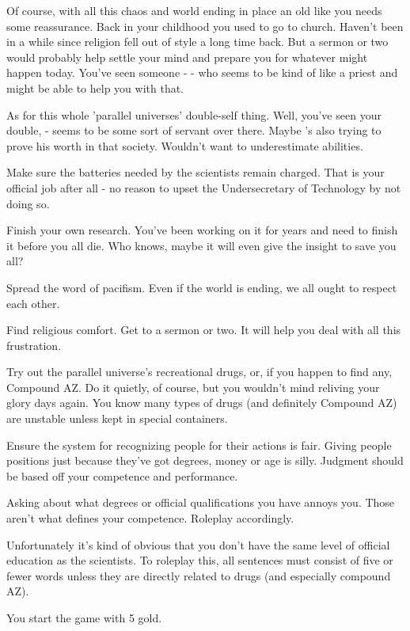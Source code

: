 \documentclass[char]{guildcamp3}
\begin{document}
Of course, with all this chaos and world ending in place an old \cTech{\human} like you needs some reassurance. Back in your childhood you used to go to church. Haven't been in a while since religion fell out of style a long time back. But a sermon or two would probably help settle your mind and prepare you for whatever might happen today. You've seen someone - \cPaladin{\intro} - who seems to be kind of like a priest and might be able to help you with that. 

As for this whole 'parallel universes' double-self thing. Well, you've seen your double, \cServant{\intro} - seems to be some sort of servant over there. Maybe \cServant{\they}'s also trying to prove his worth in that society. Wouldn't want to underestimate \cServant{\their} abilities.


\begin{itemz}[Goals]
  \item Make sure the batteries needed by the scientists remain charged. That is your official job after all - no reason to upset the Undersecretary of Technology by not doing so. 
  \item Finish your own research. You've been working on it for years and need to finish it before you all die. Who knows, maybe it will even give the insight to save you all?
  \item Spread the word of pacifism. Even if the world is ending, we all ought to respect each other.
  \item Find religious comfort. Get to a sermon or two. It will help you deal with all this frustration.
  \item Try out the parallel universe's recreational drugs, or, if you happen to find any, Compound AZ. Do it quietly, of course, but you wouldn't mind reliving your glory days again. You know many types of drugs (and definitely Compound AZ) are unstable unless kept in special containers.
  \item Ensure the system for recognizing people for their actions is fair. Giving people positions just because they've got degrees, money or age is silly. Judgment should be based off your competence and performance. 
\end{itemz}

\begin{itemz}[Notes]
  \item Asking about what degrees or official qualifications you have annoys you. Those aren't what defines your competence. Roleplay accordingly.  
  \item Unfortunately it's kind of obvious that you don't have the same level of official education as the scientists. To roleplay this, all sentences must consist of five or fewer words unless they are directly related to drugs (and especially compound AZ). 
  \item You start the game with 5 gold. 
\end{itemz}
\end{document}
